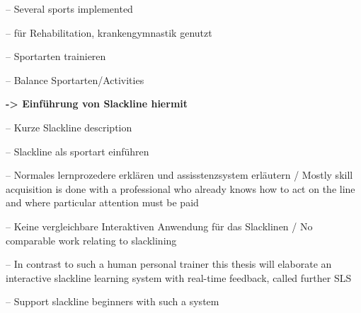 -- Several sports implemented

-- für Rehabilitation, krankengymnastik genutzt

-- Sportarten trainieren

-- Balance Sportarten/Activities

\textbf{-> Einführung von Slackline hiermit}

-- Kurze Slackline description

-- Slackline als sportart einführen

-- Normales lernprozedere erklären und assisstenzsystem erläutern / Mostly skill acquisition is done with a professional who already knows how to act on the line and where particular attention must be paid

-- Keine vergleichbare Interaktiven Anwendung für das Slacklinen / No comparable work relating to slacklining

-- In contrast to such a human personal trainer this thesis will elaborate an interactive slackline learning system with real-time feedback, called further SLS

-- Support slackline beginners with such a system
